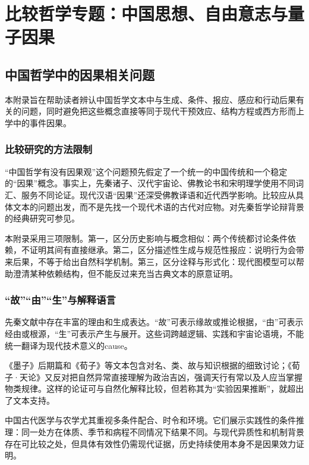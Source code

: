 \chapter{比较哲学专题：中国思想、自由意志与量子因果}
\label{app:comparative}

\section{中国哲学中的因果相关问题}

\begin{learninggoals}
本附录旨在帮助读者辨认中国哲学文本中与生成、条件、报应、感应和行动后果有关的问题，同时避免把这些概念直接等同于现代干预效应、结构方程或西方形而上学中的事件因果。
\end{learninggoals}

\subsection{比较研究的方法限制}

“中国哲学有没有因果观”这个问题预先假定了一个统一的中国传统和一个稳定的“因果”概念。事实上，先秦诸子、汉代宇宙论、佛教论书和宋明理学使用不同词汇、服务不同论证。现代汉语“因果”还深受佛教译语和近代西学影响。比较应从具体文本的问题出发，而不是先找一个现代术语的古代对应物。对先秦哲学论辩背景的经典研究可参见\textcite{graham1989}。

本附录采用三项限制。第一，区分历史影响与概念相似：两个传统都讨论条件依赖，不证明其间有直接继承。第二，区分描述性生成与规范性报应：说明行为会带来后果，不等于给出自然科学机制。第三，区分诠释与形式化：现代图模型可以帮助澄清某种依赖结构，但不能反过来充当古典文本的原意证明。

\subsection{“故”“由”“生”与解释语言}

先秦文献中存在丰富的理由和生成表达。“故”可表示缘故或推论根据，“由”可表示经由或根源，“生”可表示产生与展开。这些词跨越逻辑、实践和宇宙论语境，不能统一翻译为现代技术意义的cause。

《墨子》后期篇和《荀子》等文本包含对名、类、故与知识根据的细致讨论；《荀子·天论》又反对把自然异常直接理解为政治吉凶，强调天行有常以及人应当掌握物类规律\parencite{mozi2010,xunzi2014}。这样的论证可与自然化解释比较，但若称其为“实验因果推断”，就超出了文本支持。

中国古代医学与农学尤其重视多条件配合、时令和环境。它们展示实践性的条件推理：同一处方在体质、季节和病程不同情况下结果不同。与现代异质性和机制背景存在可比较之处，但具体有效性仍需现代证据，历史持续使用本身不是因果效力证明。

